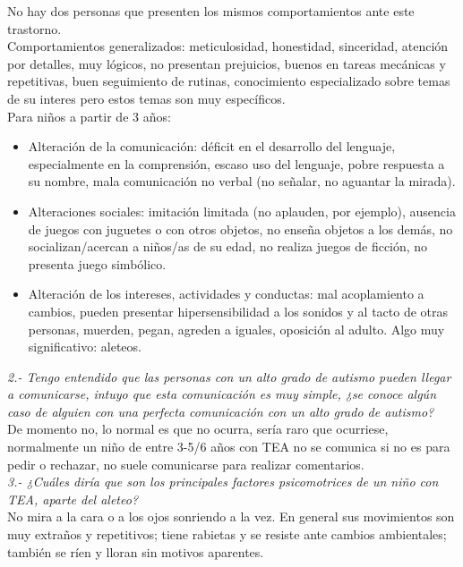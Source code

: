 \documentclass[letterpaper,12pt]{article}
\begin{document}
No hay dos personas que presenten los mismos comportamientos ante este trastorno. \\
Comportamientos generalizados: meticulosidad, honestidad, sinceridad, atención por detalles, muy lógicos, no presentan prejuicios, buenos en tareas mecánicas y repetitivas, buen seguimiento de rutinas, conocimiento especializado sobre temas de su interes pero estos temas son muy específicos.\\

Para niños a partir de 3 años:
\begin{itemize}
\item Alteración de la comunicación: déficit en el desarrollo del lenguaje, especialmente en la comprensión, escaso uso del lenguaje, pobre respuesta a su nombre, mala comunicación no verbal (no señalar, no aguantar la mirada).

\item Alteraciones sociales: imitación limitada (no aplauden, por ejemplo), ausencia de juegos con juguetes o con otros objetos, no enseña objetos a los demás, no socializan/acercan a niños/as de su edad, no realiza juegos de ficción, no presenta juego simbólico.

\item Alteración de los intereses, actividades y conductas: mal acoplamiento a cambios, pueden presentar hipersensibilidad a los sonidos y al tacto de otras personas, muerden, pegan, agreden a iguales, oposición al adulto. Algo muy significativo: aleteos.
\end{itemize}

\textit{2.- Tengo entendido que las personas con un alto grado de autismo pueden llegar a comunicarse, intuyo que esta comunicación es muy simple, ¿se conoce algún caso de alguien con una perfecta comunicación con un alto grado de autismo?}\\

De momento no, lo normal es que no ocurra, sería raro que ocurriese, normalmente un niño de entre 3-5/6 años con TEA no se comunica si no es para pedir o rechazar, no suele comunicarse para realizar comentarios.  \\

\textit{3.- ¿Cuáles diría que son los principales factores psicomotrices de un niño con TEA, aparte del aleteo?}\\

No mira a la cara o a los ojos sonriendo a la vez.
En general sus movimientos son muy extraños y repetitivos; tiene rabietas y se resiste ante cambios ambientales; también se ríen y lloran sin motivos aparentes.\\
\end{document}
